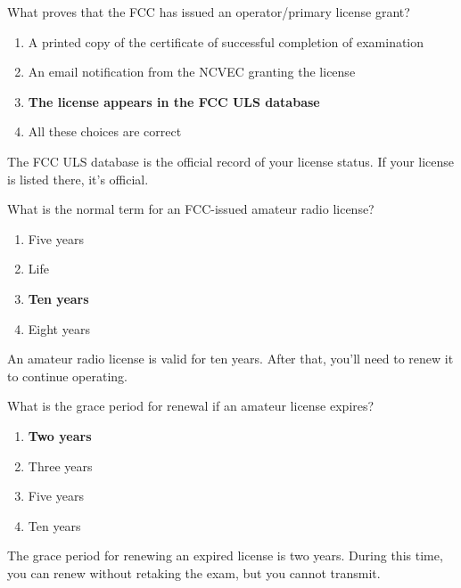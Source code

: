 \begin{tcolorbox}[colback=gray!10!white,colframe=black!75!black,title={T1A05}]
    What proves that the FCC has issued an operator/primary license grant?
    \begin{enumerate}[label=\Alph*),noitemsep]
        \item A printed copy of the certificate of successful completion of examination
        \item An email notification from the NCVEC granting the license
        \item \textbf{The license appears in the FCC ULS database}
        \item All these choices are correct
    \end{enumerate}
\end{tcolorbox}
The FCC ULS database is the official record of your license status. If your license is listed there, it's official.

\begin{tcolorbox}[colback=gray!10!white,colframe=black!75!black,title={T1C08}]
    What is the normal term for an FCC-issued amateur radio license?
    \begin{enumerate}[label=\Alph*),noitemsep]
        \item Five years
        \item Life
        \item \textbf{Ten years}
        \item Eight years
    \end{enumerate}
\end{tcolorbox}
An amateur radio license is valid for ten years. After that, you'll need to renew it to continue operating.

\begin{tcolorbox}[colback=gray!10!white,colframe=black!75!black,title={T1C09}]
    What is the grace period for renewal if an amateur license expires?
    \begin{enumerate}[label=\Alph*),noitemsep]
        \item \textbf{Two years}
        \item Three years
        \item Five years
        \item Ten years
    \end{enumerate}
\end{tcolorbox}
The grace period for renewing an expired license is two years. During this time, you can renew without retaking the exam, but you cannot transmit.

